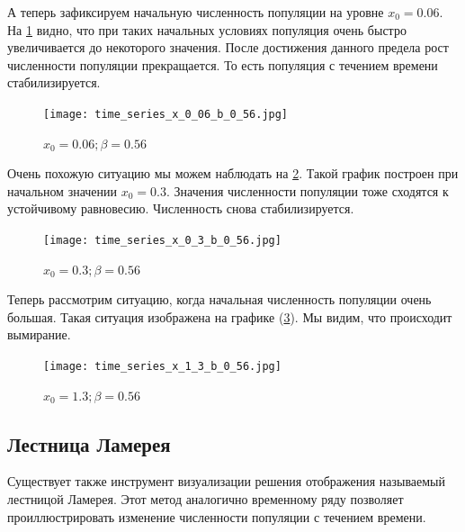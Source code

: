         А теперь зафиксируем начальную численность популяции на уровне \(x_0 = 0.06\). На \ref{time_series_x_0_06_b_0_56} видно, что при таких начальных условиях популяция очень быстро увеличивается до некоторого значения. После достижения данного предела рост численности популяции прекращается. То есть популяция с течением времени стабилизируется.
    
        \begin{figure}
            \centering
            \texttt{[image: time\_series\_x\_0\_06\_b\_0\_56.jpg]}

            \captionsetup{justification=centering}
            \caption{\(x_0 = 0.06; \beta = 0.56\)}
            \label{time_series_x_0_06_b_0_56}
        \end{figure}

        Очень похожую ситуацию мы можем наблюдать на \ref{time_series_x_0_3_b_0_56}. Такой график построен при начальном значении \(x_0 = 0.3\). Значения численности популяции тоже сходятся к устойчивому равновесию. Численность снова стабилизируется.
    
        \begin{figure}
            \centering
            \texttt{[image: time\_series\_x\_0\_3\_b\_0\_56.jpg]}

            \captionsetup{justification=centering}
            \caption{\(x_0 = 0.3; \beta = 0.56\)}
            \label{time_series_x_0_3_b_0_56}
        \end{figure}

        Теперь рассмотрим ситуацию, когда начальная численность популяции очень большая. Такая ситуация изображена на графике (\ref{time_series_x_1_2_b_0_56}). Мы видим, что происходит вымирание.
    
        \begin{figure}
            \centering
            \texttt{[image: time\_series\_x\_1\_3\_b\_0\_56.jpg]}

            \captionsetup{justification=centering}
            \caption{\(x_0 = 1.3; \beta = 0.56\)}
            \label{time_series_x_1_2_b_0_56}
        \end{figure}

    \subsection{Лестница Ламерея}
    
        Существует также инструмент визуализации решения отображения называемый лестницой Ламерея. Этот метод аналогично временному ряду позволяет проиллюстрировать изменение численности популяции с течением времени.
            
